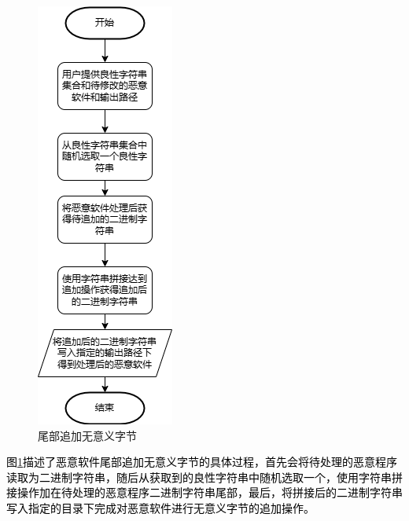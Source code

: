 \begin{figure}
  \centering
  \includegraphics[]{images/append_strings.png}
  \caption{尾部追加无意义字节}\label{fig:append_strings}
\end{figure}
\textcolor{black}{图\ref{fig:append_strings}描述了恶意软件尾部追加无意义字节的具体过程，首先会将待处理的恶意程序读取为二进制字符串，随后从获取到的良性字符串中随机选取一个，使用字符串拼接操作加在待处理的恶意程序二进制字符串尾部，最后，将拼接后的二进制字符串写入指定的目录下完成对恶意软件进行无意义字节的追加操作。}

